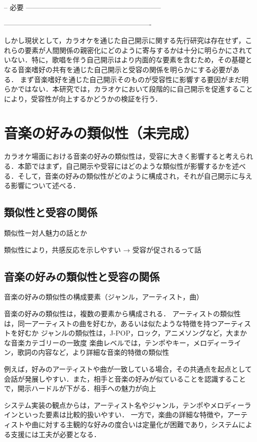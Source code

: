 
-- 必要 -----------------------------------------------------------




----------------------------------------------------------------

しかし現状として，カラオケを通じた自己開示に関する先行研究は存在せず，これらの要素が人間関係の親密化にどのように寄与するかは十分に明らかにされていない．特に，歌唱を伴う自己開示はより内面的な要素を含むため，その基礎となる音楽嗜好の共有を通じた自己開示と受容の関係を明らかにする必要がある．
まず音楽嗜好を通じた自己開示そのものが受容性に影響する要因がまだ明らかではない．本研究では，カラオケにおいて段階的に自己開示を促進することにより，受容性が向上するかどうかの検証を行う．

\section{音楽の好みの類似性（未完成）}
カラオケ場面における音楽の好みの類似性は，受容に大きく影響すると考えられる．本節ではまず，自己開示や受容にはどのような類似性が影響するかを述べる．そして，音楽の好みの類似性がどのように構成され，それが自己開示に与える影響について述べる．

\subsection{類似性と受容の関係}
類似性ー対人魅力の話とか

類似性により，共感反応を示しやすい → 受容が促されるって話


\subsection{音楽の好みの類似性と受容の関係}
音楽の好みの類似性の構成要素（ジャンル，アーティスト，曲）

音楽の好みの類似性は，複数の要素から構成される．
アーティストの類似性は，同一アーティストの曲を好むか，あるいは似たような特徴を持つアーティストを好むか
ジャンルの類似性は，J-POP，ロック，アニメソングなど，大まかな音楽カテゴリーの一致度
楽曲レベルでは，テンポやキー，メロディーライン，歌詞の内容など，より詳細な音楽的特徴の類似性

例えば，好みのアーティストや曲が一致している場合，その共通点を起点として会話が発展しやすい．また，相手と音楽の好みが似ていることを認識することで，開示ハードルが下がる．相手への魅力が向上

システム実装の観点からは，アーティスト名やジャンル，テンポやメロディーラインといった要素は比較的扱いやすい．
一方で，楽曲の詳細な特徴や，アーティストや曲に対する主観的な好みの度合いは定量化が困難であり，システムによる支援には工夫が必要となる．



